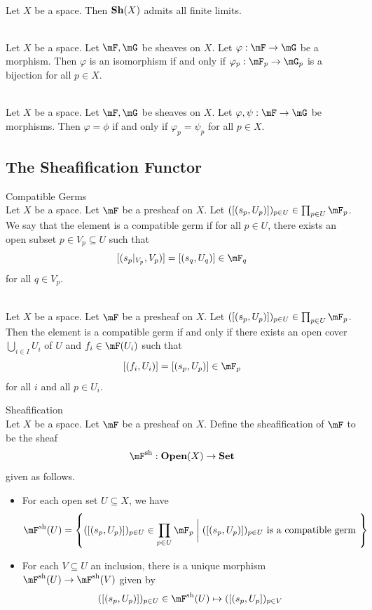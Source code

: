 \documentclass[a4paper]{article}
\begin{document}
\begin{prp}{}{}\\
Let $X$ be a space. Then $\bold{Sh}(X)$ admits all finite limits. 
\end{prp}

\begin{prp}{}{}\\
Let $X$ be a space. Let $\mF,\mG$ be sheaves on $X$. Let $\varphi:\mF\to\mG$ be a morphism. Then $\varphi$ is an isomorphism if and only if $\varphi_p:\mF_p\to\mG_p$ is a bijection for all $p\in X$. 
\end{prp}

\begin{prp}{}{}\\
Let $X$ be a space. Let $\mF,\mG$ be sheaves on $X$. Let $\varphi,\psi:\mF\to\mG$ be morphisms. Then $\varphi=\phi$ if and only if $\varphi_p=\psi_p$ for all $p\in X$. 
\end{prp}

\subsection{The Sheafification Functor}
\begin{defn}{Compatible Germs}{}\\
Let $X$ be a space. Let $\mF$ be a presheaf on $X$. Let $([(s_p,U_p)])_{p\in U}\in\prod_{p\in U}\mF_p$. We say that the element is a compatible germ if for all $p\in U$, there exists an open subset $p\in V_p\subseteq U$ such that $$[(s_p|_{V_p},V_p)]=[(s_q,U_q)]\in\mF_q$$ for all $q\in V_p$. 
\end{defn}

\begin{lmm}{}{}\\
Let $X$ be a space. Let $\mF$ be a presheaf on $X$. Let $([(s_p,U_p)])_{p\in U}\in\prod_{p\in U}\mF_p$. Then the element is a compatible germ if and only if there exists an open cover $\bigcup_{i\in I}U_i$ of $U$ and $f_i\in\mF(U_i)$ such that $$[(f_i,U_i)]=[(s_p,U_p)]\in\mF_p$$ for all $i$ and all $p\in U_i$. 
\end{lmm}

\begin{defn}{Sheafification}{}\\
Let $X$ be a space. Let $\mF$ be a presheaf on $X$. Define the sheafification of $\mF$ to be the sheaf $$\mF^\text{sh}:\bold{Open}(X)\to\bold{Set}$$ given as follows. 
\begin{itemize}
\item For each open set $U\subseteq X$, we have $$\mF^\text{sh}(U)=\left\{([(s_p,U_p)])_{p\in U}\in\prod_{p\in U}\mF_p\;\bigg{|}\;([(s_p,U_p)])_{p\in U}\text{ is a compatible germ }\right\}$$
\item For each $V\subseteq U$ an inclusion, there is a unique morphism $\mF^\text{sh}(U)\to\mF^\text{sh}(V)$ given by $$([(s_p,U_p)])_{p\in U}\in\mF^\text{sh}(U)\mapsto([(s_p,U_p])_{p\in V}$$
\end{itemize}
\end{defn}
\end{document}
